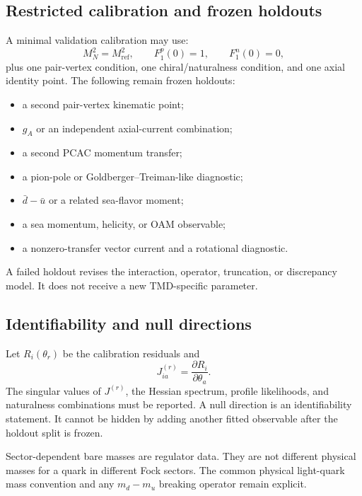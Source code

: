 \documentclass[11pt]{article}
\begin{document}
\subsection{Restricted calibration and frozen holdouts}

A minimal validation calibration may use:
\begin{equation}
 M_N^2=M_{\mathrm{ref}}^2,
 \qquad
 F_1^p(0)=1,
 \qquad
 F_1^n(0)=0,
\end{equation}
plus one pair-vertex condition, one chiral/naturalness condition, and one axial
identity point.  The following remain frozen holdouts:
\begin{itemize}
 \item a second pair-vertex kinematic point;
 \item \(g_A\) or an independent axial-current combination;
 \item a second PCAC momentum transfer;
 \item a pion-pole or Goldberger--Treiman-like diagnostic;
 \item \(\bar d-\bar u\) or a related sea-flavor moment;
 \item a sea momentum, helicity, or OAM observable;
 \item a nonzero-transfer vector current and a rotational diagnostic.
\end{itemize}
A failed holdout revises the interaction, operator, truncation, or discrepancy
model.  It does not receive a new TMD-specific parameter.

\subsection{Identifiability and null directions}

Let \(R_i(\theta_r)\) be the calibration residuals and
\begin{equation}
 J_{ia}^{(r)}
 =\frac{\partial R_i}{\partial\theta_a}.
\end{equation}
The singular values of \(J^{(r)}\), the Hessian spectrum, profile likelihoods,
and naturalness combinations must be reported.  A null direction is an
identifiability statement.  It cannot be hidden by adding another fitted
observable after the holdout split is frozen.

Sector-dependent bare masses are regulator data.  They are not different
physical masses for a quark in different Fock sectors.  The common physical
light-quark mass convention and any \(m_d-m_u\) breaking operator remain
explicit.
\end{document}
